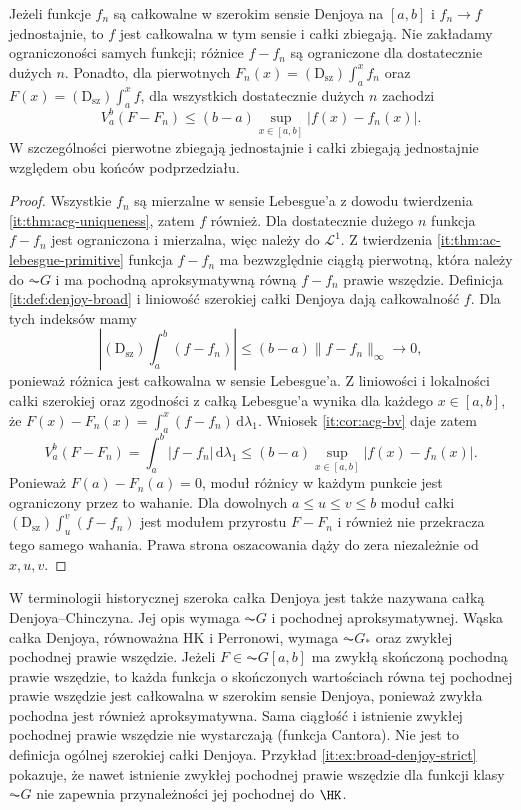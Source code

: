 \begin{wniosek}\label{ma1:kh:cor:wide-denjoy-uniform}
Jeżeli funkcje $f_n$ są całkowalne w szerokim sensie Denjoya na $[a,b]$ i $f_n\to f$ jednostajnie, to $f$ jest całkowalna w tym sensie i całki zbiegają. Nie zakładamy ograniczoności samych funkcji; różnice $f-f_n$ są ograniczone dla dostatecznie dużych $n$. Ponadto, dla pierwotnych
$F_n(x)=(\mathrm D_{\mathrm{sz}})\int_a^x f_n$ oraz
$F(x)=(\mathrm D_{\mathrm{sz}})\int_a^x f$, dla wszystkich
dostatecznie dużych $n$ zachodzi
\[
 V_a^b(F-F_n)\le (b-a)\sup_{x\in[a,b]}|f(x)-f_n(x)|.
\]
W szczególności pierwotne zbiegają jednostajnie i
całki zbiegają jednostajnie względem obu końców podprzedziału.
\end{wniosek}
\begin{proof}
Wszystkie $f_n$ są mierzalne w sensie Lebesgue'a z dowodu twierdzenia \ref{it:thm:acg-uniqueness}, zatem $f$ również. Dla dostatecznie dużego $n$ funkcja $f-f_n$ jest ograniczona i mierzalna, więc należy do $\mathcal L^1$. Z twierdzenia \ref{it:thm:ac-lebesgue-primitive} funkcja $f-f_n$ ma bezwzględnie ciągłą pierwotną, która należy do $\AC G$ i ma pochodną aproksymatywną równą $f-f_n$ prawie wszędzie. Definicja \ref{it:def:denjoy-broad} i liniowość szerokiej całki Denjoya dają całkowalność $f$. Dla tych indeksów mamy
\[
 \left|(\mathrm D_{\mathrm{sz}})\int_a^b(f-f_n)\right|
 \le (b-a)\|f-f_n\|_\infty\longrightarrow0,
\]
ponieważ różnica jest całkowalna w sensie Lebesgue'a.
Z liniowości i lokalności całki szerokiej oraz zgodności
z całką Lebesgue'a wynika dla każdego $x\in[a,b]$,
że $F(x)-F_n(x)=\int_a^x(f-f_n)\,\mathrm d\lambda_1$.
Wniosek \ref{it:cor:acg-bv} daje zatem
\[
 V_a^b(F-F_n)=\int_a^b|f-f_n|\,\mathrm d\lambda_1
 \le(b-a)\sup_{x\in[a,b]}|f(x)-f_n(x)|.
\]
Ponieważ $F(a)-F_n(a)=0$, moduł różnicy w każdym
punkcie jest ograniczony przez to wahanie.
Dla dowolnych $a\le u\le v\le b$ moduł całki
$(\mathrm D_{\mathrm{sz}})\int_u^v(f-f_n)$ jest
modułem przyrostu $F-F_n$ i również nie przekracza
tego samego wahania. Prawa strona oszacowania dąży
do zera niezależnie od $x,u,v$.
\end{proof}

\begin{uwaga}
W terminologii historycznej szeroka całka Denjoya jest także nazywana całką Denjoya--Chinczyna. Jej opis wymaga $\AC G$ i pochodnej aproksymatywnej. Wąska całka Denjoya, równoważna HK i Perronowi, wymaga $\AC G_*$ oraz zwykłej pochodnej prawie wszędzie. Jeżeli $F\in\AC G[a,b]$ ma zwykłą skończoną pochodną prawie wszędzie, to każda funkcja o skończonych wartościach równa tej pochodnej prawie wszędzie jest całkowalna w szerokim sensie Denjoya, ponieważ zwykła pochodna jest również aproksymatywna. Sama ciągłość i istnienie zwykłej pochodnej prawie wszędzie nie wystarczają (funkcja Cantora). Nie jest to definicja ogólnej szerokiej całki Denjoya. Przykład \ref{it:ex:broad-denjoy-strict} pokazuje, że nawet istnienie zwykłej pochodnej prawie wszędzie dla funkcji klasy $\AC G$ nie zapewnia przynależności jej pochodnej do $\HK$.
\end{uwaga}


